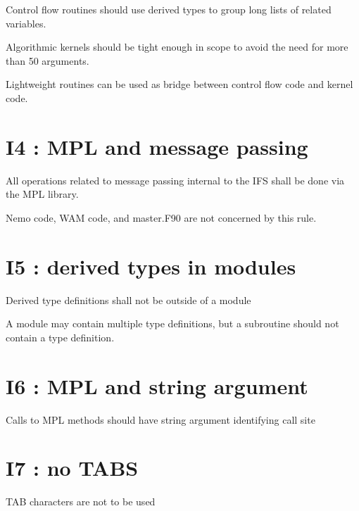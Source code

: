 \documentclass[letterpaper,10pt,english]{sphinxmanual}
\begin{document}
\sphinxAtStartPar
Control flow routines should use derived types to group long lists of related variables.

\sphinxAtStartPar
Algorithmic kernels should be tight enough in scope to avoid the need for more than 50 arguments.

\sphinxAtStartPar
Lightweight  routines can be used as bridge between control flow code and kernel code.

\sphinxstepscope


\section{I4 : MPL and message passing}
\label{\detokenize{rules/I4:i4-mpl-and-message-passing}}\label{\detokenize{rules/I4::doc}}
\sphinxAtStartPar
All operations related to message passing internal to the IFS shall be done via the MPL library.

\sphinxAtStartPar
Nemo code, WAM code, and master.F90 are not concerned by this rule.

\sphinxstepscope


\section{I5 : derived types in modules}
\label{\detokenize{rules/I5:i5-derived-types-in-modules}}\label{\detokenize{rules/I5::doc}}
\sphinxAtStartPar
Derived type definitions shall not be outside of a module

\sphinxAtStartPar
A module may contain multiple type definitions, but a subroutine should
not contain a type definition.

\sphinxstepscope


\section{I6 : MPL and string argument}
\label{\detokenize{rules/I6:i6-mpl-and-string-argument}}\label{\detokenize{rules/I6::doc}}
\sphinxAtStartPar
Calls to MPL methods should have string argument identifying call site

\sphinxstepscope


\section{I7 : no TABS}
\label{\detokenize{rules/I7:i7-no-tabs}}\label{\detokenize{rules/I7::doc}}
\sphinxAtStartPar
TAB characters are not to be used
\end{document}

